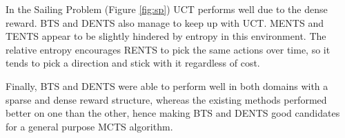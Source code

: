             In the Sailing Problem (Figure \ref{fig:sp}) UCT performs well due to the dense reward.  BTS and DENTS also manage to keep up with UCT. MENTS and TENTS appear to be slightly hindered by entropy in this environment. The relative entropy encourages RENTS to pick the same actions over time, so it tends to pick a direction and stick with it regardless of cost.
            
            Finally, BTS and DENTS were able to perform well in both domains with a sparse and dense reward structure, whereas the existing methods performed better on one than the other, hence making BTS and DENTS good candidates for a general purpose MCTS algorithm.

            
